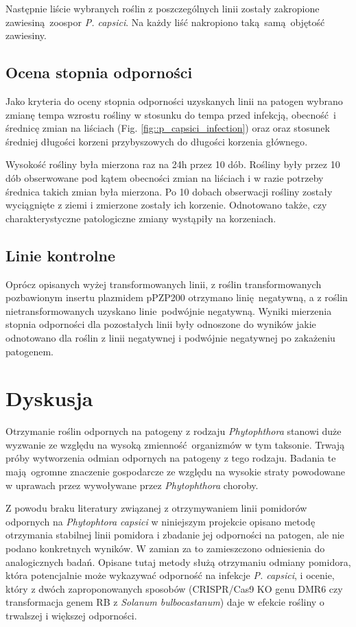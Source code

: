 \documentclass[two column, twoside, a4paper]{article}
\begin{document}
Następnie liście wybranych roślin z poszczególnych linii zostały zakropione zawiesiną zoospor \textit{P. capsici}. Na każdy liść nakropiono taką samą objętość zawiesiny.

\subsection{Ocena stopnia odporności}

Jako kryteria do oceny stopnia odporności uzyskanych linii na patogen wybrano zmianę tempa wzrostu rośliny w stosunku do tempa przed infekcją, obecność i średnicę zmian na liściach (Fig. \ref{fig::p_capsici_infection}) oraz oraz stosunek średniej długości korzeni przybyszowych do długości korzenia głównego\autocite{Lamour2012}.

Wysokość rośliny była mierzona raz na 24h przez 10 dób. Rośliny były przez 10 dób obserwowane pod kątem obecności zmian na liściach i w razie potrzeby średnica takich zmian była mierzona. Po 10 dobach obserwacji rośliny zostały wyciągnięte z ziemi i zmierzone zostały ich korzenie. Odnotowano także, czy charakterystyczne patologiczne zmiany wystąpiły na korzeniach.

\subsection{Linie kontrolne}

Oprócz opisanych wyżej transformowanych linii, z roślin transformowanych pozbawionym insertu plazmidem pPZP200 otrzymano linię negatywną, a z roślin nietransformowanych uzyskano linie podwójnie negatywną. Wyniki mierzenia stopnia odporności dla pozostałych linii były odnoszone do wyników jakie odnotowano dla roślin z linii negatywnej i podwójnie negatywnej po zakażeniu patogenem.

\section{Dyskusja}

Otrzymanie roślin odpornych na patogeny z rodzaju \textit{Phytophthora} stanowi duże wyzwanie ze względu na wysoką zmienność organizmów w tym taksonie. Trwają próby wytworzenia odmian odpornych na patogeny z tego rodzaju. Badania te mają ogromne znaczenie gospodarcze ze względu na wysokie straty powodowane w uprawach przez wywoływane przez \textit{Phytophthora} choroby\autocite{Lamour2012, Barchenger2018, Sy2005, Chen2019, Song2003, Bagga2019}.

Z powodu braku literatury związanej z otrzymywaniem linii pomidorów odpornych na \textit{Phytophtora capsici} w niniejszym projekcie opisano metodę otrzymania stabilnej linii pomidora i zbadanie jej odporności na patogen, ale nie podano konkretnych wyników. W zamian za to zamieszczono odniesienia do analogicznych badań. Opisane tutaj metody służą otrzymaniu odmiany pomidora, która potencjalnie może wykazywać odporność na infekcje \textit{P. capsici}, i ocenie, który z dwóch zaproponowanych sposobów (CRISPR/Cas9 KO genu DMR6 czy transformacja genem RB z \textit{Solanum bulbocastanum}) daje w efekcie rośliny o trwalszej i większej odporności.
\end{document}
